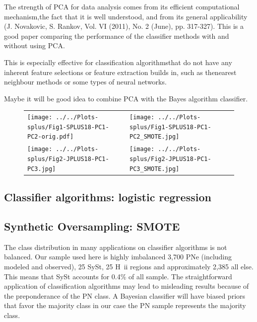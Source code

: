 \documentclass[11pt]{article}
\newcommand\raiselabel[1]{\raisebox{0.9\figwidth}[-0.5\figwidth]{#1}}
\begin{document}
The strength of PCA for data analysis comes from its efficient computational mechanism,the fact that it is well understood, and from its general applicability (J. Novakovic, S. Rankov, Vol. VI (2011), No. 2 (June), pp. 317-327). This is a good paper comparing the performance of  the classifier methods with and without using PCA.

This is especially effective for classification algorithmsthat do not have any inherent feature selections or feature extraction builds in, such as thenearest neighbour methods or some types of neural networks.

Maybe it will be good idea to combine PCA with the Bayes algorithm classifier. 


\begin{figure}
\centering
\begin{tabular}{l l}
 \texttt{[image: ../../Plots-splus/Fig1-SPLUS18-PC1-PC2-orig.pdf]} & \texttt{[image: ../../Plots-splus/Fig1-SPLUS18-PC1-PC2\_SMOTE.jpg]} \\
\texttt{[image: ../../Plots-splus/Fig2-JPLUS18-PC1-PC3.jpg]} & \texttt{[image: ../../Plots-splus/Fig2-JPLUS18-PC1-PC3\_SMOTE.jpg]} 
\end{tabular}
\end{figure}

\subsection{Classifier algorithms: logistic regression}
\label{sec:Classifiers}

\subsection{Synthetic Oversampling: SMOTE}
\label{sec:smote}

The class distribution in many applications on classifier algorithms is not balanced. Our sample used here is highly imbalanced 3,700 PNe (including modeled and observed), 25 SySt, 25 H~{\sc ii} regions and approximately  2,385 all else. This means that SySt accounts for  0.4\% of all sample. The straightforward application of classification algorithms may lead to misleading results because of the preponderance of the PN class. A Bayesian classifier will have biased priors that favor the majority class in our case the PN sample represents the majority class.
\end{document}
